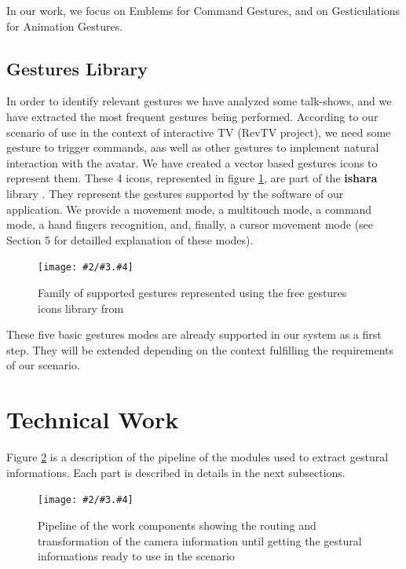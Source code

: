 \documentclass{llncs}
\newcommand{\imagepathext}[5]{%
\begin{figure}[!htbp]
\hfil\texttt{[image: \#2/\#3.\#4]}\hfil
\caption{#5\label{#3}}
\end{figure}}
\newcommand{\png}[2]{\imagepathext{width=\columnwidth}{pics}{#1}{png}{#2}}
\begin{document}
In our work, we focus on Emblems for Command Gestures, and on Gesticulations for Animation Gestures.

\subsection{Gestures Library}

In order to identify relevant gestures we have analyzed some talk-shows, and we have extracted the most frequent gestures being performed.
According to our scenario of use in the context of interactive TV (RevTV project), we need some
gesture to trigger commands, aas well as other gestures to implement natural interaction with the avatar.
We have created a vector based gestures icons to represent them.
These 4 icons, represented in figure \ref{handg}, are part of the \textbf{ishara} library \cite{ishara}.  They
represent the gestures supported by the software of our application. We provide a movement mode, a multitouch mode, a command mode, a hand fingers recognition,
and, finally, a cursor movement mode (see Section 5 for detailled explanation of these modes).

\png{handg}{Family of supported gestures represented using the free gestures icons library from \cite{ishara}}

These five basic gestures modes are already supported in our system as a first step. They will be extended depending on the context fulfilling the requirements
of our scenario.

\section{Technical Work}

Figure \ref{pipeline} is a description of the pipeline of the modules used to
extract gestural informations. Each part is described in details in the next
subsections.

\png{pipeline}{Pipeline of the work components showing the routing and
transformation of the camera information until getting the gestural informations
ready to use in the scenario}
\end{document}
